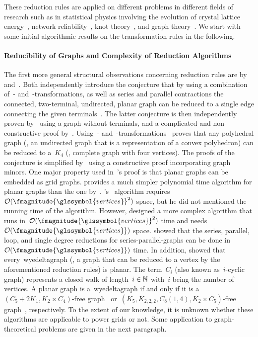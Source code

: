 These reduction rules are applied on different problems in different fields of
research such as in statistical physics involving the evolution of crystal
lattice energy~\parencite{Bax16}, network
reliability~\parencite{Leh63,Sat93,Tra02}, knot theory~\parencite{Rei83,Tra02},
and graph theory~\parencite{Ake60,Cha17}. We start with some initial algorithmic
results on the transformation rules in the following.

\paragraph{Reducibility of Graphs and Complexity of Reduction Algorithms}
% 
The first more general structural observations concerning reduction rules are
by~\textcite{Ake60} and~\textcite{Leh63}. Both independently introduce the
conjecture that by using a combination of~-
and~-transformations, as well as series and parallel
contractions the connected, two-terminal, undirected, planar graph can be
reduced to a single edge connecting the given
terminals~\parencite[pp.795ff.]{Leh63}. The latter conjecture is then
independently proven by~\textcite{Gru03} using a graph without terminals, and a
complicated and non-constructive proof by~\textcite{Epi66}.
Using~-
and~-transformations~\citeauthor{Epi66} proves that any
polyhedral graph (\ie, an undirected graph that is a representation of a convex
polyhedron) can be reduced to a~$K_4$ (\ie, complete graph with four vertices).
The proofs of the conjecture is simplified by~\textcite{Tru89} using a
constructive proof incorporating graph minors. One major property used
in~\citeauthor{Tru89}'s proof is that planar graphs can be embedded as grid
graphs. \citeauthor{Tru89} provides a much simpler polynomial time algorithm for
planar graphs than the one by~\textcite{Feo85}.
\citeauthor{Tru89}'s~\parencite{Tru89} algorithm
requires~$\bigO(\fmagnitude{\glssymbol{vertices}}^2)$ space, but he did not
mentioned the running time of the algorithm. However, \textcite{Feo85} designed
a more complex algorithm that runs
in~$\bigO(\fmagnitude{\glssymbol{vertices}}^2)$ time and
needs~$\bigO(\fmagnitude{\glssymbol{vertices}})$ space. \textcite{Val79} showed
that the series, parallel, loop, and single degree reductions for
series-parallel-graphs can be done in~$\bigO(\fmagnitude{\glssymbol{vertices}})$
time. In addition, \textcite{Pol83} showed that every~\gls{wyedeltagraph} (\ie,
a graph that can be reduced to a vertex by the aforementioned reduction rules)
is planar. The term~$C_i$ (also known as~$i$-cyclic graph) represents a closed
walk of length~$i\in\mathbb{N}$ with~$i$ being the number of vertices. A planar
graph is a~\gls{wyedeltagraph} if and only if it is a~$(C_5+2K_1, K_2\times
C_4)$-free graph~\parencite{Pol83} or~$(K_5, K_{2,2,2}, C_8(1,4), K_2\times
C_5)$-free graph~\parencite{Arn90,Sat90}, respectively. To the extent of our
knowledge, it is unknown whether these algorithms are applicable to power grids
or not. Some application to graph-theoretical problems are given in the next
paragraph.
% 
